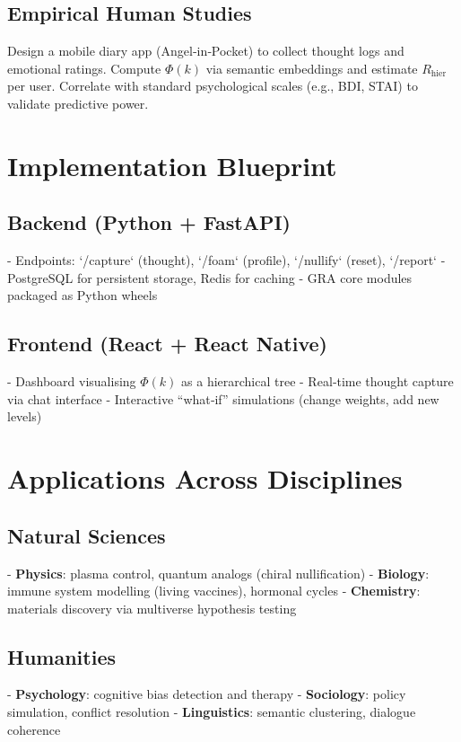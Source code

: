 \documentclass[12pt,a4paper]{article}
\begin{document}
\subsection{Empirical Human Studies}
Design a mobile diary app (Angel‑in‑Pocket) to collect thought logs and emotional ratings. Compute $\Phi(k)$ via semantic embeddings and estimate $R_{\text{hier}}$ per user. Correlate with standard psychological scales (e.g., BDI, STAI) to validate predictive power.

\section{Implementation Blueprint}

\subsection{Backend (Python + FastAPI)}
- Endpoints: `/capture` (thought), `/foam` (profile), `/nullify` (reset), `/report`
- PostgreSQL for persistent storage, Redis for caching
- GRA core modules packaged as Python wheels

\subsection{Frontend (React + React Native)}
- Dashboard visualising $\Phi(k)$ as a hierarchical tree
- Real‑time thought capture via chat interface
- Interactive ``what‑if'' simulations (change weights, add new levels)

\section{Applications Across Disciplines}

\subsection{Natural Sciences}
- \textbf{Physics}: plasma control, quantum analogs (chiral nullification)
- \textbf{Biology}: immune system modelling (living vaccines), hormonal cycles
- \textbf{Chemistry}: materials discovery via multiverse hypothesis testing

\subsection{Humanities}
- \textbf{Psychology}: cognitive bias detection and therapy
- \textbf{Sociology}: policy simulation, conflict resolution
- \textbf{Linguistics}: semantic clustering, dialogue coherence
\end{document}
